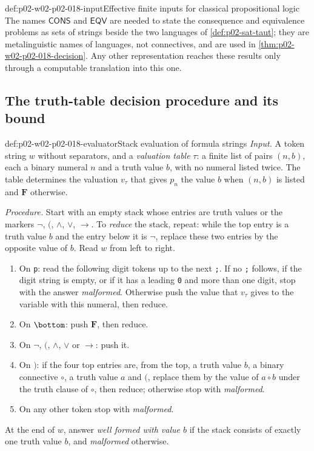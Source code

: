 \begin{hbconvention}{def:p02-w02-p02-018-input}{Effective finite inputs for classical propositional logic}
The names \(\mathsf{CONS}\) and \(\mathsf{EQV}\) are needed to state the
consequence and equivalence problems as sets of strings beside the two
languages of \cref{def:p02-sat-taut}; they are metalinguistic names of
languages, not connectives, and are used in
\cref{thm:p02-w02-p02-018-decision}.  Any other representation reaches these
results only through a computable translation into this one.
\end{hbconvention}

\subsection{The truth-table decision procedure and its bound}
\label{sec:p02-w02-p02-018-truth-table}

\begin{hbmethod}{def:p02-w02-p02-018-evaluator}{Stack evaluation of formula strings}
\emph{Input.}  A token string \(w\) without separators, and a
\emph{valuation table} \(\tau\): a finite list of pairs \((n,b)\), each a
binary numeral \(n\) and a truth value \(b\), with no numeral listed twice.
The table determines the valuation \(v_\tau\) that gives \(p_n\) the value
\(b\) when \((n,b)\) is listed and \(\mathbf F\) otherwise.

\emph{Procedure.}  Start with an empty stack whose entries are truth values
or the markers \(\neg\), \((\), \(\land\), \(\lor\), \(\to\).  To
\emph{reduce} the stack, repeat: while the top entry is a truth value \(b\)
and the entry below it is \(\neg\), replace these two entries by the
opposite value of \(b\).  Read \(w\) from left to right.
\begin{enumerate}
\item On \texttt{p}: read the following digit tokens up to the next
      \texttt{;}.  If no \texttt{;} follows, if the digit string is empty, or
      if it has a leading \texttt{0} and more than one digit, stop with the
      answer \emph{malformed}.  Otherwise push the value that \(v_\tau\)
      gives to the variable with this numeral, then reduce.
\item On \(\bottom\): push \(\mathbf F\), then reduce.
\item On \(\neg\), \((\), \(\land\), \(\lor\) or \(\to\): push it.
\item On \()\): if the four top entries are, from the top, a truth value
      \(b\), a binary connective \(\circ\), a truth value \(a\) and \((\),
      replace them by the value of \(a\circ b\) under the truth clause of
      \(\circ\), then reduce; otherwise stop with \emph{malformed}.
\item On any other token stop with \emph{malformed}.
\end{enumerate}
At the end of \(w\), answer \emph{well formed with value \(b\)} if the stack
consists of exactly one truth value \(b\), and \emph{malformed} otherwise.
\end{hbmethod}

